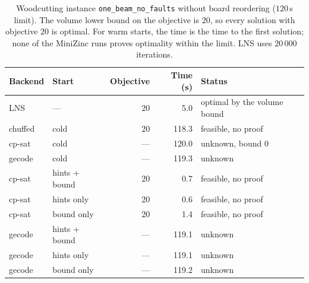 \documentclass[11pt,a4paper]{article}
\begin{document}
\begin{table}[t]
\centering
\footnotesize
\caption{Woodcutting instance \texttt{one\_beam\_no\_faults} without board
reordering ($120$\,s limit). The volume lower bound on the objective is $20$,
so every solution with objective $20$ is optimal. For warm starts, the time is
the time to the first solution; none of the MiniZinc runs proves optimality
within the limit. LNS uses $20\,000$ iterations.}
\label{tab:woodcutting-example}
\begin{tabular}{@{}llrrl@{}}
\toprule
Backend & Start & Objective & Time (s) & Status \\
\midrule
LNS     & ---           & 20 & 5.0   & optimal by the volume bound \\
chuffed & cold          & 20 & 118.3 & feasible, no proof \\
cp-sat  & cold          & ---  & 120.0 & unknown, bound $0$ \\
gecode  & cold          & ---  & 119.3 & unknown \\
cp-sat  & hints + bound & 20 & 0.7   & feasible, no proof \\
cp-sat  & hints only    & 20 & 0.6   & feasible, no proof \\
cp-sat  & bound only    & 20 & 1.4   & feasible, no proof \\
gecode  & hints + bound & ---  & 119.1 & unknown \\
gecode  & hints only    & ---  & 119.1 & unknown \\
gecode  & bound only    & ---  & 119.2 & unknown \\
\bottomrule
\end{tabular}
\end{table}
\end{document}
